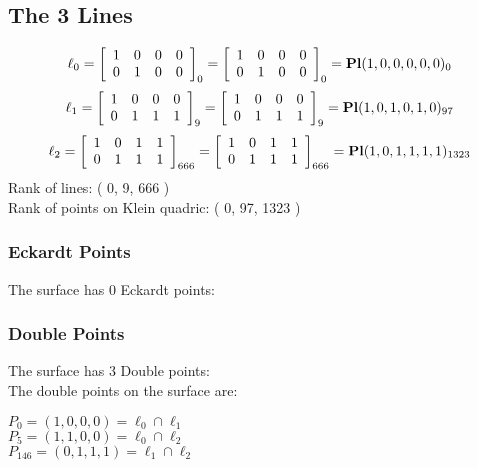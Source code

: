 \documentclass{article}
\begin{document}
{\subsection*{The 3 Lines}
$$
\ell_{0} = 
\left[
\begin{array}{*{4}{r}}
1 & 0 & 0 & 0\\
0 & 1 & 0 & 0\\
\end{array}
\right]
_{0}
=
\left[
\begin{array}{*{4}c}
1  & 0  & 0  & 0\\
0  & 1  & 0  & 0\\
\end{array}
\right]_{0}
={\rm\bf Pl}(1,0,0,0,0,0 )_{0}$$
$$
\ell_{1} = 
\left[
\begin{array}{*{4}{r}}
1 & 0 & 0 & 0\\
0 & 1 & 1 & 1\\
\end{array}
\right]
_{9}
=
\left[
\begin{array}{*{4}c}
1  & 0  & 0  & 0\\
0  & 1  & 1  & 1\\
\end{array}
\right]_{9}
={\rm\bf Pl}(1,0,1,0,1,0 )_{97}$$
$$
\ell_{2} = 
\left[
\begin{array}{*{4}{r}}
1 & 0 & 1 & 1\\
0 & 1 & 1 & 1\\
\end{array}
\right]
_{666}
=
\left[
\begin{array}{*{4}c}
1  & 0  & 1  & 1\\
0  & 1  & 1  & 1\\
\end{array}
\right]_{666}
={\rm\bf Pl}(1,0,1,1,1,1 )_{1323}$$
Rank of lines: ( 0, 9, 666 )\\
Rank of points on Klein quadric: ( 0, 97, 1323 )\\
\subsubsection*{Eckardt Points}
The surface has 0 Eckardt points:\\
\subsubsection*{Double Points}
The surface has 3 Double points:\\
The double points on the surface are:\\
\begin{multicols}{2}
\noindent
$P_{0} = ( 1, 0, 0, 0 ) = \ell_{0} \cap \ell_{1} $\\
$P_{5} = ( 1, 1, 0, 0 ) = \ell_{0} \cap \ell_{2} $\\
$P_{146} = ( 0, 1, 1, 1 ) = \ell_{1} \cap \ell_{2} $\\
\end{multicols}
}
\end{document}
